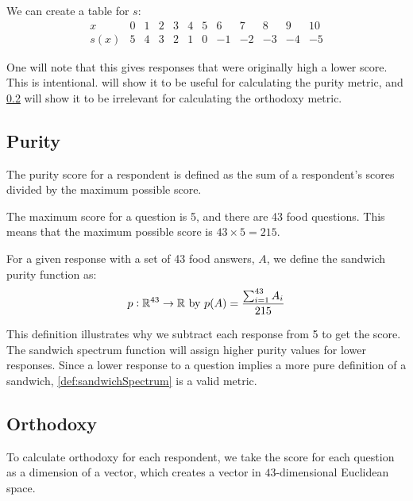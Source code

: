 We can create a table for $s$:
\begin{equation*}
	\begin{array}{l|r|r|r|r|r|r|r|r|r|r|r}
		x    & 0 & 1 & 2 & 3 & 4 & 5 &  6 &  7 &  8 &  9 & 10\\\hline
		s(x) & 5 & 4 & 3 & 2 & 1 & 0 & -1 & -2 & -3 & -4 & -5
	\end{array}
\end{equation*}

One will note that this gives responses that were originally high a lower score.
This is intentional.
 will show it to be useful for calculating the purity metric, and \cref{subsec:orthodoxyMetric} will show it to be irrelevant for calculating the orthodoxy metric.

\subsection{Purity}\label{subsec:purityMetric}
The purity score for a respondent is defined as the sum of a respondent's scores divided by the maximum possible score.

The maximum score for a question is 5, and there are 43 food questions.
This means that the maximum possible score is $43 \times 5 = 215$.

\begin{definition}
	For a given response with a set of 43 food answers, $A$, we define the sandwich purity function as:
	\begin{equation}
		p : \mathbb{R}^{43} \to \mathbb{R}\ \text{by}\ p(A) = \frac{\sum_{i = 1}^{43} A_i}{215}
	\end{equation}
\end{definition}

This definition illustrates why we subtract each response from 5 to get the score.
The sandwich spectrum function will assign higher purity values for lower responses.
Since a lower response to a question implies a more pure definition of a sandwich, \cref{def:sandwichSpectrum} is a valid metric.

\subsection{Orthodoxy}\label{subsec:orthodoxyMetric}
To calculate orthodoxy for each respondent, we take the score for each question as a dimension of a vector, which creates a vector in $43$-dimensional Euclidean space.

